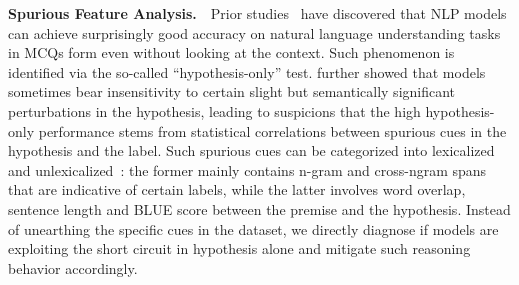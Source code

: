 \textbf{Spurious Feature Analysis.}~~Prior studies~\cite{endingonly1,zellers2018swag} 
have discovered that NLP models can achieve surprisingly 
good accuracy on natural language understanding tasks in MCQs form even without looking at the context. 
Such phenomenon is identified via the so-called ``hypothesis-only'' test. \citeauthor{sanchez2018behavior} 
further showed that models sometimes bear insensitivity to 
certain slight but semantically significant perturbations in the hypothesis, 
leading to suspicions that the high hypothesis-only performance 
stems from statistical correlations between spurious cues in the 
hypothesis and the label. Such spurious cues can be categorized 
into lexicalized~\cite{naik2018stress} and unlexicalized~\cite{bowman2015large}: the former mainly contains n-gram and cross-ngram spans that are indicative of certain labels, while the latter involves word overlap, sentence length and BLUE score between the premise and the hypothesis. Instead of unearthing the specific cues in the dataset, we directly diagnose if models are exploiting the short circuit in hypothesis alone 
and mitigate such reasoning behavior accordingly.


